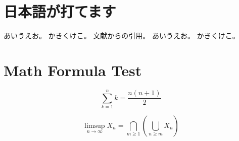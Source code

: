 \documentclass[pdflatex,ja=standard]{bxjsarticle}
\begin{document}
\section{日本語が打てます}
あいうえお。
かきくけこ。
文献からの引用\cite{9999999999}。\newline
あいうえお。
かきくけこ。

\section{Math Formula Test}

$$ \sum^{n}_{k=1}k = \frac{n(n+1)}{2} $$

$$
    \limsup_{n \to \infty} X_n
        = \bigcap_{m \ge 1} \left(
            \bigcup_{n \ge m} X_n
        \right)
$$





\end{document}
